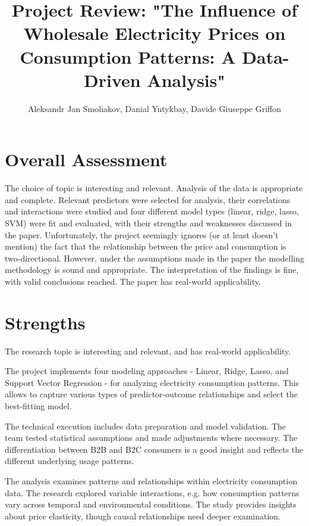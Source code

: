 \documentclass[12pt]{article}
\title{Project Review: "The Influence of Wholesale Electricity Prices on Consumption Patterns: A Data-Driven Analysis"}
\author{Aleksandr Jan Smoliakov, Danial Yntykbay, Davide Giuseppe Griffon}
\date{}
\begin{document}
\maketitle

\section{Overall Assessment}

\hspace{1.5em}The choice of topic is interesting and relevant. Analysis of the data is appropriate and complete. Relevant predictors were selected for analysis, their correlations and interactions were studied and four different model types (linear, ridge, lasso, SVM) were fit and evaluated, with their strengths and weaknesses discussed in the paper. Unfortunately, the project seemingly ignores (or at least doesn’t mention) the fact that the relationship between the price and consumption is two-directional. However, under the assumptions made in the paper the modelling methodology is sound and appropriate. The interpretation of the findings is fine, with valid conclusions reached. The paper has real-world applicability.

\section{Strengths}

\hspace{1.5em}The research topic is interesting and relevant, and has real-world applicability.

The project implements four modeling approaches - Linear, Ridge, Lasso, and Support Vector Regression - for analyzing electricity consumption patterns. This allows to capture various types of predictor-outcome relationships and select the best-fitting model.

The technical execution includes data preparation and model validation. The team tested statistical assumptions and made adjustments where necessary. The differentiation between B2B and B2C consumers is a good insight and reflects the different underlying usage patterns.

The analysis examines patterns and relationships within electricity consumption data. The research explored variable interactions, e.g. how consumption patterns vary across temporal and environmental conditions. The study provides insights about price elasticity, though causal relationships need deeper examination.
\end{document}
